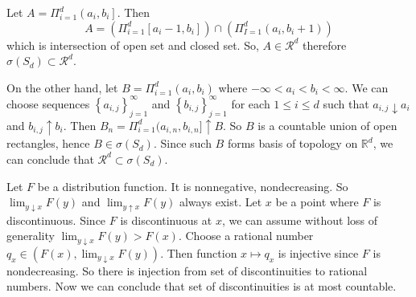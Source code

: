 \begin{problem}[1.1.2] \hfill

	Let $A = \Pi_{i=1}^d \left ( a_i, b_i \right ]$. Then 
	\begin{equation*}
		A = \left ( \Pi_{i=1}^d [a_i -1, b_i] \right ) \cap \left ( \Pi_{I=1}^d (a_i, b_i +1) \right )
		\label{<+label+>}
	\end{equation*}
	which is intersection of open set and closed set.
	So, $A \in \mathcal{R}^d$ therefore $\sigma\left( S_d \right) \subset \mathcal{R}^d$.

	On the other hand, let $B = \Pi_{i=1}^d (a_i, b_i)$ where $-\infty < a_i < b_i < \infty$.
	We can choose sequences $\left\{ a_{i, j} \right\}_{j=1}^{\infty}$ and $\left\{ b_{i, j} \right\}_{j=1}^{\infty}$ for each $1 \leq i \leq d$ such that $a_{i, j} \downarrow a_i$ and $b_{i, j} \uparrow b_i$.
	Then $B_n = \Pi_{i=1}^d (a_{i, n}, b_{i, n}] \uparrow B$. So $B$ is a countable union of open rectangles, hence $B \in \sigma\left( S_d \right)$. 
	Since such $B$ forms basis of topology on $\mathbb{R}^d$, we can conclude that $\mathcal{R}^d \subset \sigma\left( S_d \right)$. 

	
\end{problem}

\begin{problem}[1.2.3] \hfill

	Let $F$ be a distribution function. It is nonnegative, nondecreasing. So $\lim_{y\downarrow x}F(y)$ and $\lim_{y\uparrow x}F(y)$ always exist.
	Let $x$ be a point where $F$ is discontinuous. Since $F$ is discontinuous at $x$, we can assume without loss of generality $\lim_{y\downarrow x}F(y) > F(x)$. Choose a rational number $q_x \in \left ( F(x), \lim_{y\downarrow x} F(y) \right )$. Then function $x \mapsto q_x$ is injective since $F$ is nondecreasing. So there is injection from set of discontinuities to rational numbers. Now we can conclude that set of discontinuities is at most countable.
\end{problem}

